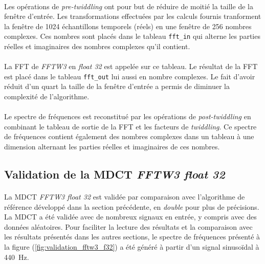 \documentclass{article}
\begin{document}
    \paragraph{}
    Les opérations de \emph{pre-twiddling} ont pour but de réduire de moitié la taille de la fenêtre d'entrée. Les transformations effectuées par les calculs fournis tranforment la fenêtre de 1024 échantillons temporels (réels) en une fenêtre de 256 nombres complexes. Ces nombres sont placés dans le tableau \texttt{fft\_in} qui alterne les parties réelles et imaginaires des nombres complexes qu'il contient.

    \paragraph{}
    La FFT de \emph{FFTW3} en \emph{float 32} est appelée sur ce tableau. Le résultat de la FFT est placé dans le tableau \texttt{fft\_out} lui aussi en nombre complexes. Le fait d'avoir réduit d'un quart la taille de la fenêtre d'entrée a permis de diminuer la complexité de l'algorithme.

    \paragraph{}
    Le spectre de fréquences est reconstitué par les opérations de \emph{post-twiddling} en combinant le tableau de sortie de la FFT et les facteurs de \emph{twiddling}. Ce spectre de fréquences contient également des nombres complexes dans un tableau à une dimension alternant les parties réelles et imaginaires de ces nombres.


    \subsection{Validation de la MDCT \emph{FFTW3 float 32}}
    \paragraph{}
    La MDCT \emph{FFTW3 float 32} est validée par comparaison avec l'algorithme de référence développé dans la section précédente, en \emph{double} pour plus de précisions. La MDCT a été validée avec de nombreux signaux en entrée, y compris avec des données aléatoires. Pour faciliter la lecture des résultats et la comparaison avec les résultats présentés dans les autres sections, le spectre de fréquences présenté à la figure (\ref{fig:validation_fftw3_f32}) a été généré à partir d'un signal sinusoïdal à \SI{440}{\hertz}.
\end{document}
